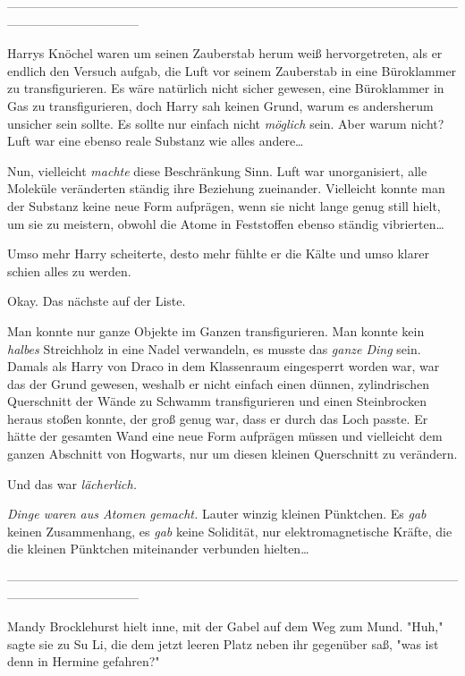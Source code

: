 {--------------------------------------------------------------------------------------------------------------------------------------------

Harrys Knöchel waren um seinen Zauberstab herum weiß hervorgetreten, als er endlich den Versuch aufgab, die Luft vor seinem Zauberstab in eine Büroklammer zu transfigurieren. Es wäre natürlich nicht sicher gewesen, eine Büroklammer in Gas zu transfigurieren, doch Harry sah keinen Grund, warum es andersherum unsicher sein sollte. Es sollte nur einfach nicht \emph{möglich} sein. Aber warum nicht? Luft war eine ebenso reale Substanz wie alles andere…

Nun, vielleicht \emph{machte} diese Beschränkung Sinn. Luft war unorganisiert, alle Moleküle veränderten ständig ihre Beziehung zueinander. Vielleicht konnte man der Substanz keine neue Form aufprägen, wenn sie nicht lange genug still hielt, um sie zu meistern, obwohl die Atome in Feststoffen ebenso ständig vibrierten…

Umso mehr Harry scheiterte, desto mehr fühlte er die Kälte und umso klarer schien alles zu werden.

Okay. Das nächste auf der Liste.

Man konnte nur ganze Objekte im Ganzen transfigurieren. Man konnte kein \emph{halbes} Streichholz in eine Nadel verwandeln, es musste das \emph{ganze Ding} sein. Damals als Harry von Draco in dem Klassenraum eingesperrt worden war, war das der Grund gewesen, weshalb er nicht einfach einen dünnen, zylindrischen Querschnitt der Wände zu Schwamm transfigurieren und einen Steinbrocken heraus stoßen konnte, der groß genug war, dass er durch das Loch passte. Er hätte der gesamten Wand eine neue Form aufprägen müssen und vielleicht dem ganzen Abschnitt von Hogwarts, nur um diesen kleinen Querschnitt zu verändern.

Und das war \emph{lächerlich.}

\emph{Dinge waren aus Atomen gemacht.} Lauter winzig kleinen Pünktchen. Es \emph{gab} keinen Zusammenhang, es \emph{gab} keine Solidität, nur elektromagnetische Kräfte, die die kleinen Pünktchen miteinander verbunden hielten…

--------------------------------------------------------------------------------------------------------------------------------------------

Mandy Brocklehurst hielt inne, mit der Gabel auf dem Weg zum Mund. "Huh," sagte sie zu Su Li, die dem jetzt leeren Platz neben ihr gegenüber saß, "was ist denn in Hermine gefahren?"

}
